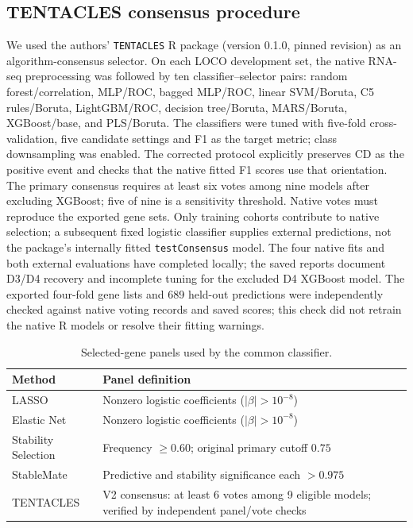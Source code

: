 \subsection{TENTACLES consensus procedure}
\label{sec:tentacles_method}
We used the authors' \texttt{TENTACLES} R package (version 0.1.0, pinned revision) \cite{montesi2026tentacles} as an algorithm-consensus selector. On each LOCO development set, the native RNA-seq preprocessing was followed by ten classifier--selector pairs: random forest/correlation, MLP/ROC, bagged MLP/ROC, linear SVM/Boruta, C5 rules/Boruta, LightGBM/ROC, decision tree/Boruta, MARS/Boruta, XGBoost/base, and PLS/Boruta. The classifiers were tuned with five-fold cross-validation, five candidate settings and F1 as the target metric; class downsampling was enabled. The corrected protocol explicitly preserves CD as the positive event and checks that the native fitted F1 scores use that orientation. The primary consensus requires at least six votes among nine models after excluding XGBoost; five of nine is a sensitivity threshold. Native votes must reproduce the exported gene sets. Only training cohorts contribute to native selection; a subsequent fixed logistic classifier supplies external predictions, not the package's internally fitted \texttt{testConsensus} model. The four native fits and both external evaluations have completed locally; the saved reports document D3/D4 recovery and incomplete tuning for the excluded D4 XGBoost model. The exported four-fold gene lists and 689 held-out predictions were independently checked against native voting records and saved scores; this check did not retrain the native R models or resolve their fitting warnings.

\begin{table}[!t]
\caption{Selected-gene panels used by the common classifier.}
\label{tab:method_overview}
\centering\footnotesize
\setlength{\tabcolsep}{3pt}
\renewcommand{\arraystretch}{1.13}
\begin{tabular}{@{}p{2.0cm}p{5.9cm}@{}}
\toprule
Method & Panel definition \\
\midrule
LASSO & Nonzero logistic coefficients ($|\beta|>10^{-8}$) \\
Elastic Net & Nonzero logistic coefficients ($|\beta|>10^{-8}$) \\
Stability Selection & Frequency $\geq0.60$; original primary cutoff $0.75$ \\
StableMate & Predictive and stability significance each $>0.975$ \\
TENTACLES & V2 consensus: at least 6 votes among 9 eligible models; verified by independent panel/vote checks \\
\bottomrule
\end{tabular}
\end{table}
